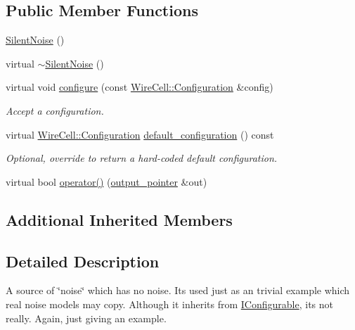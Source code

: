 \subsection*{Public Member Functions}
\begin{DoxyCompactItemize}
\item 
\hyperlink{class_wire_cell_1_1_gen_1_1_silent_noise_a81611debdbeb57a80e87e335b0d5e595}{Silent\+Noise} ()
\item 
virtual \hyperlink{class_wire_cell_1_1_gen_1_1_silent_noise_a63e7f75cfea902753880474dc746da8e}{$\sim$\+Silent\+Noise} ()
\item 
virtual void \hyperlink{class_wire_cell_1_1_gen_1_1_silent_noise_a1bf271654f4bcfbb5270d6181bcfa75c}{configure} (const \hyperlink{namespace_wire_cell_a9f705541fc1d46c608b3d32c182333ee}{Wire\+Cell\+::\+Configuration} \&config)
\begin{DoxyCompactList}\small\item\em Accept a configuration. \end{DoxyCompactList}\item 
virtual \hyperlink{namespace_wire_cell_a9f705541fc1d46c608b3d32c182333ee}{Wire\+Cell\+::\+Configuration} \hyperlink{class_wire_cell_1_1_gen_1_1_silent_noise_adb72fd47827c62cb4a6634545fd62f87}{default\+\_\+configuration} () const
\begin{DoxyCompactList}\small\item\em Optional, override to return a hard-\/coded default configuration. \end{DoxyCompactList}\item 
virtual bool \hyperlink{class_wire_cell_1_1_gen_1_1_silent_noise_ac723376ec602f4b7391028e837219edd}{operator()} (\hyperlink{class_wire_cell_1_1_i_source_node_ae2743237513016d7f69d68aac1104951}{output\+\_\+pointer} \&out)
\end{DoxyCompactItemize}
\subsection*{Additional Inherited Members}


\subsection{Detailed Description}
A source of \char`\"{}noise\char`\"{} which has no noise. It\textquotesingle{}s used just as an trivial example which real noise models may copy. Although it inherits from \hyperlink{class_wire_cell_1_1_i_configurable}{I\+Configurable}, it\textquotesingle{}s not really. Again, just giving an example. 


